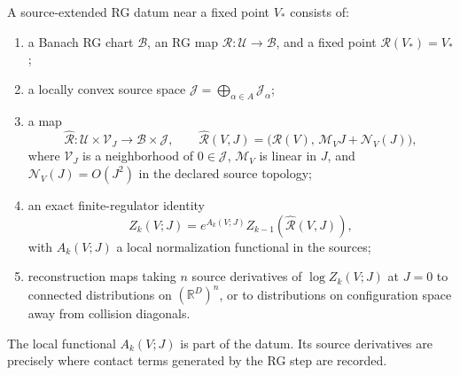 \begin{definition}
\label{def:source-extended-rg-datum}
A source-extended RG datum near a fixed point \(V_\ast\) consists of:
\begin{enumerate}
  \item a Banach RG chart \(\mathcal B\), an RG map
  \(\mathcal R:\mathcal U\to\mathcal B\), and a fixed point
  \(\mathcal R(V_\ast)=V_\ast\);
  \item a locally convex source space
  \(\mathcal J=\bigoplus_{\alpha\in A}\mathcal J_\alpha\);
  \item a map
  \begin{equation}
    \widehat{\mathcal R}:\mathcal U\times\mathcal V_J
    \longrightarrow \mathcal B\times\mathcal J,
    \qquad
    \widehat{\mathcal R}(V,J)=
    \bigl(\mathcal R(V),\,\mathcal M_VJ+\mathcal N_V(J)\bigr),
    \label{eq:source-extended-rg-map}
  \end{equation}
  where \(\mathcal V_J\) is a neighborhood of \(0\in\mathcal J\),
  \(\mathcal M_V\) is linear in \(J\), and
  \(\mathcal N_V(J)=O(J^2)\) in the declared source topology;
  \item an exact finite-regulator identity
  \begin{equation}
    Z_k(V;J)
    =
    e^{A_k(V;J)}
    Z_{k-1}\!\left(\widehat{\mathcal R}(V,J)\right),
    \label{eq:source-rg-exact-identity}
  \end{equation}
  with \(A_k(V;J)\) a local normalization functional in the sources;
  \item reconstruction maps taking \(n\) source derivatives of
  \(\log Z_k(V;J)\) at \(J=0\) to connected distributions on
  \((\mathbb R^D)^n\), or to distributions on configuration space away from
  collision diagonals.
\end{enumerate}
The local functional \(A_k(V;J)\) is part of the datum.  Its source
derivatives are precisely where contact terms generated by the RG step are
recorded.
\end{definition}

